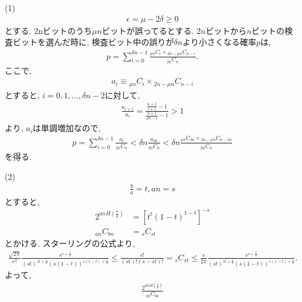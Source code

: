 \begin{ex}
    \label{ex12.27}
    (1) \
    \begin{align*}
        \epsilon = \mu - 2 \delta \ge 0
    \end{align*}
    とする. 2nビットのうち$\mu n$ビットが誤ってるとする. $2n$ビットから$n$ビットの検査ビットを選んだ時に, 検査ビット中の誤りが$\delta n$より小さくなる確率$p$は,
    \begin{align*}
        p = \sum_{i=0}^{\delta n - 1} \frac{{}_{\mu n} C _{i} \times {}_{2n - \mu n} C _{n - i}}{{}_{2n} C_n}.
    \end{align*}
    ここで,
    \begin{align*}
        a_i \equiv {}_{\mu n} C _{i} \times {}_{2n - \mu n} C _{n - i}
    \end{align*}
    とすると, $i = 0, 1, ..., \delta n - 2$に対して,
    \begin{align*}
        \frac{a_{i+1}}{a_i} = \frac{
            \frac{n+1}{i+1} - 1
        }{
            \frac{n+1}{\mu n - i } - 1
        }
        > 1
    \end{align*}
    より, $a_i$は単調増加なので,
    \begin{align*}
        p =
        \sum_{i=0}^{\delta n - 1} \frac{a_i}{{}_{2n} C_n} <
        \delta n \frac{a_{\delta n}}{{}_{2n} C_n} <
        \delta n
        \frac{{}_{\mu n} C _{\delta n} \times {}_{2n - \mu n} C _{n - \delta n}}{{}_{2n} C_n}
    \end{align*}
    を得る.
    \par
    (2)\
    \begin{align*}
        \frac{b}{a} = t, an = s
    \end{align*}
    とすると,
    \begin{align*}
        2^{an H \left( \frac{b}{a}\right)} & = \left[ t^{t} (1-t)^{1-t}\right]^{-s} \\
        {}_{an} C_{bn}                     & = {}_s C_{st}
    \end{align*}
    とかける.
    スターリングの公式より,
    \begin{align*}
        \frac{\sqrt{2 \pi}}{e^2} \frac{s^{s + \frac{1}{2}}}{(st)^{st + \frac{1}{2}} (s(1-t))^{s(1-t) + \frac{1}{2}}}
        \le
        \frac{s!}{(st)! (s - st)!}={}_s C_{st}
        \le
        \frac{e}{2 \pi} \frac{s^{s + \frac{1}{2}}}{(st)^{st + \frac{1}{2}} (s(1-t))^{s(1-t)+ \frac{1}{2}}}.
    \end{align*}
    よって,
    \begin{align*}
        \frac{2^{an H \left( \frac{b}{a}\right)}}{{}_{an} C_{bn}}

\end{align*}
\end{ex}
